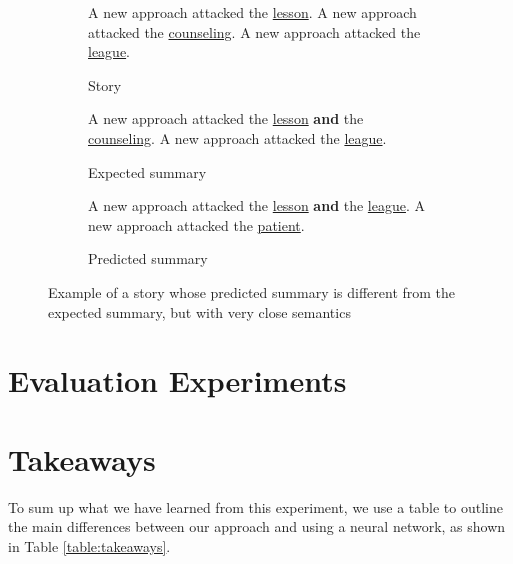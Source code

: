 \begin{figure}[H]
\begin{subfigure}{\textwidth}
\begin{displayquote}
A new approach attacked the \underline{lesson}. A new approach attacked the \underline{counseling}. A new approach attacked the \underline{league}.
\end{displayquote}
\caption{Story}
\vspace{\baselineskip}
\end{subfigure}
\begin{subfigure}{\textwidth}
\begin{displayquote}
A new approach attacked the \underline{lesson} \textbf{and} the \underline{counseling}. A new approach attacked the \underline{league}.
\end{displayquote}
\caption{Expected summary}
\vspace{\baselineskip}
\end{subfigure}
\begin{subfigure}{\textwidth}
\begin{displayquote}
A new approach attacked the \underline{lesson} \textbf{and} the \underline{league}. A new approach attacked the \underline{patient}.
\end{displayquote}
\caption{Predicted summary}
\end{subfigure}
\caption{Example of a story whose predicted summary is different from the expected summary, but with very close semantics}
\label{fig:discrepancy_example}
\end{figure}

\section{Evaluation Experiments}
\label{sec:evaluation_experiments}


\section{Takeaways}
\label{sec:evaluation_takeaways}

To sum up what we have learned from this experiment, we use a table to outline the main differences between our approach and using a neural network, as shown in Table \ref{table:takeaways}.

